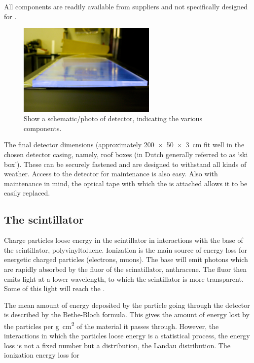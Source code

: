 All components are readily available from suppliers and not specifically designed for \hisparc.

\begin{figure}
    \centering
    \includegraphics[width=0.6\textwidth]
                    {plots/experiment/ADL_115651.jpg}
    \caption{Show a schematic/photo of detector, indicating the various components.}
    \label{fig:schematic_detector}
\end{figure}

The final detector dimensions (approximately \SI[product-units=power]{200 x 50 x 3}{\centi\meter} fit well in the chosen detector casing, namely, roof boxes (in Dutch generally referred to as `ski box'). These can be securely fastened and are designed to withstand all kinds of weather. Access to the detector for maintenance is also easy. Also with maintenance in mind, the optical tape with which the \pmt is attached allows it to be easily replaced.


\subsection{The scintillator}

Charge particles loose energy in the scintillator in interactions with the base of the scintillator, polyvinyltoluene. Ionization is the main source of energy loss for energetic charged particles (electrons, muons). The base will emit photons which are rapidly absorbed by the fluor of the scinatillator, anthracene. The fluor then emits light at a lower wavelength, to which the scintillator is more transparent. Some of this light will reach the \pmt.

The mean amount of energy deposited by the particle going through the detector is described by the Bethe-Bloch formula. This gives the amount of energy lost by the particles per \si{\gram\centi\meter\squared} of the material it passes through. However, the interactions in which the particles loose energy is a statistical process, the energy loss is not a fixed number but a distribution, the Landau distribution. The ionization energy loss for

